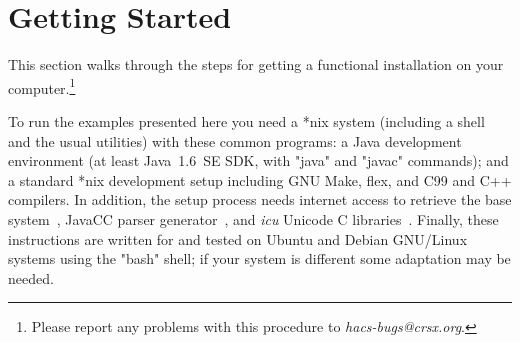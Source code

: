 \documentclass[12pt]{article} %
\begin{document}
\section{Getting Started}
\label{sec:run}

This section walks through the steps for getting a functional \HAX installation on your
computer.\footnote{Please report any problems with this procedure to \emph{hacs-bugs@crsx.org}.}

\begin{requirements}
  To run the \HAX examples presented here you need a *nix system (including a shell and the usual
  utilities) with these common programs: a Java development environment (at least Java~1.6~SE SDK,
  with "java" and "javac" commands); and a standard *nix development setup including GNU Make, flex,
  and C99 and C++ compilers. In addition, the setup process needs internet access to retrieve the
  \CRSX base system~\cite{crsx}, JavaCC parser generator~\cite{JavaCC}, and \emph{icu} Unicode C
  libraries~\cite{ICU}. Finally, these instructions are written for and tested on Ubuntu and Debian
  GNU/Linux systems using the "bash" shell; if your system is different some adaptation may be
  needed.
\end{requirements}
\end{document}
